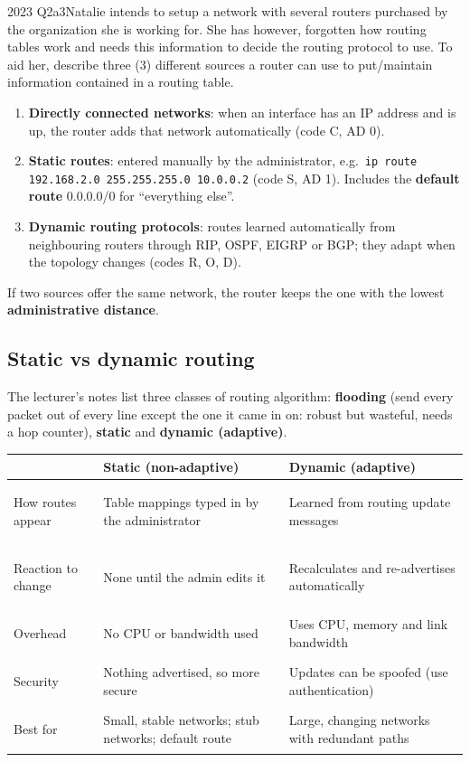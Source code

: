 \documentclass[10pt]{article}
\begin{document}
\begin{pastq}{2023 Q2a}{3}Natalie intends to setup a network with several routers purchased by the organization she is working for. She has however, forgotten how routing tables work and needs this information to decide the routing protocol to use. To aid her, describe three (3) different sources a router can use to put/maintain information contained in a routing table.\end{pastq}
\begin{ans}
\begin{enumerate}
\item \textbf{Directly connected networks}: when an interface has an IP address and is up, the router adds that network automatically (code C, AD 0).
\item \textbf{Static routes}: entered manually by the administrator, e.g.\ \texttt{ip route 192.168.2.0 255.255.255.0 10.0.0.2} (code S, AD 1). Includes the \textbf{default route} 0.0.0.0/0 for ``everything else''.
\item \textbf{Dynamic routing protocols}: routes learned automatically from neighbouring routers through RIP, OSPF, EIGRP or BGP; they adapt when the topology changes (codes R, O, D).
\end{enumerate}
If two sources offer the same network, the router keeps the one with the lowest \textbf{administrative distance}.
\end{ans}

\subsection{Static vs dynamic routing}
The lecturer's notes list three classes of routing algorithm: \textbf{flooding} (send every packet out of every line except the one it came in on: robust but wasteful, needs a hop counter), \textbf{static} and \textbf{dynamic (adaptive)}.

\begin{tabularx}{\linewidth}{@{}>{\bfseries\raggedright\arraybackslash}p{2.6cm}XX@{}}
\toprule
 & \textbf{Static (non-adaptive)} & \textbf{Dynamic (adaptive)}\\\midrule
How routes appear & Table mappings typed in by the administrator & Learned from routing update messages\\
Reaction to change & None until the admin edits it & Recalculates and re-advertises automatically\\
Overhead & No CPU or bandwidth used & Uses CPU, memory and link bandwidth\\
Security & Nothing advertised, so more secure & Updates can be spoofed (use authentication)\\
Best for & Small, stable networks; stub networks; default route & Large, changing networks with redundant paths\\
\bottomrule
\end{tabularx}
\end{document}
